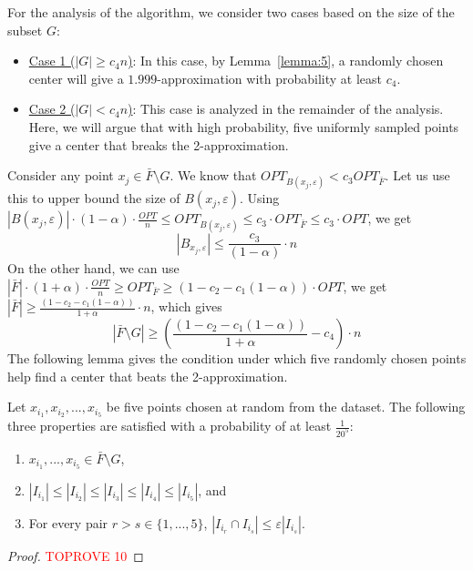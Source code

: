 \documentclass[11pt]{llncs}
\newcommand{\veps}{\varepsilon}
\begin{document}
For the analysis of the algorithm, we consider two cases based on the size of the subset $G$:
\begin{itemize}
\item \underline{Case 1 ($|G| \geq c_4 n$)}: In this case, by Lemma~\ref{lemma:5}, a randomly chosen center will give a $1.999$-approximation with probability at least $c_4$.
\item \underline{Case 2 ($|G| < c_4 n$)}: This case is analyzed in the remainder of the analysis. Here, we will argue that with high probability, five uniformly sampled points give a center that breaks the 2-approximation.
\end{itemize}
Consider any point $x_j \in \bar{F}\setminus G$. We know that $OPT_{B(x_j, \veps)} < c_3 OPT_{\bar{F}}$. Let us use this to upper bound the size of $B(x_j, \veps)$.
Using $|B(x_j, \veps)| \cdot (1-\alpha) \cdot \frac{OPT}{n} \leq OPT_{B(x_j, \veps)} \leq c_3 \cdot OPT_{\bar{F}} \leq c_3 \cdot OPT$, we get
$$
|B_{x_j, \veps}| \leq \frac{c_3}{(1-\alpha)} \cdot n
$$
On the other hand, we can use $|\bar{F}| \cdot (1+\alpha) \cdot \frac{OPT}{n} \geq OPT_{\bar{F}} \geq (1 - c_2 - c_1(1-\alpha)) \cdot OPT$, we get $|\bar{F}| \geq \frac{(1 - c_2 - c_1(1-\alpha))}{1+\alpha} \cdot n$, which gives
$$
|\bar{F} \setminus G| \geq \left(\frac{(1 - c_2 - c_1(1-\alpha))}{1+\alpha} - c_4 \right) \cdot n
$$
The following lemma gives the condition under which five randomly chosen points help find a center that beats the 2-approximation.

\begin{lemma}\label{lemma:6}
Let $x_{i_1}, x_{i_2}, ..., x_{i_5}$ be five points chosen at random from the dataset. The following three properties are satisfied with a probability of at least $\frac{1}{20^5}$:
\begin{enumerate}
\item $x_{i_1}, ..., x_{i_5} \in \bar{F} \setminus G$,
\item $|I_{i_1}| \leq |I_{i_2}| \leq |I_{i_3}| \leq |I_{i_4}| \leq |I_{i_5}|$, and
\item For every pair $r > s \in \{1, ..., 5\}$, $|I_{i_r} \cap I_{i_s}| \leq \veps |I_{i_s}|$.
\end{enumerate}
\end{lemma}
\begin{proof}\textcolor{red}{TOPROVE 10}\end{proof}
\end{document}
